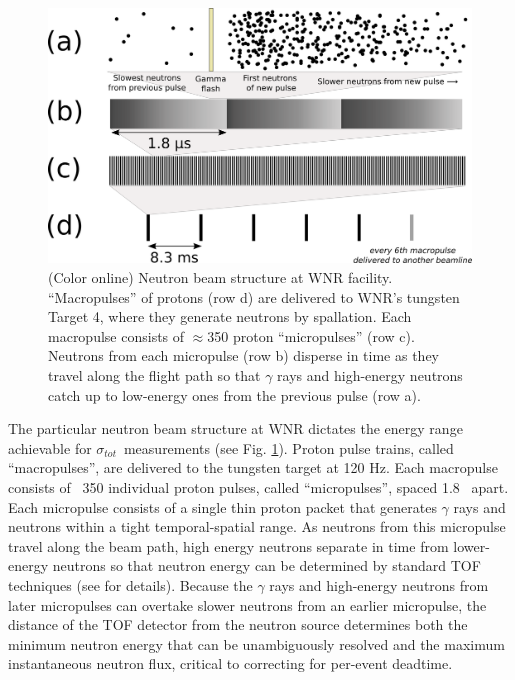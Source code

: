 \documentclass[twocolumn,secnumarabic,amssymb, nobibnotes, aps, prl,
superscriptaddress, nobalancelastpage]{revtex4}
\newcommand{\tot}{\ensuremath{\sigma_{tot}}}
\begin{document}
\begin{figure}
    \includegraphics[width=\linewidth]{figures/beamStructure.png}
    \caption{(Color online) Neutron beam structure at WNR facility.
        ``Macropulses'' of protons (row d) are delivered to
        WNR's tungsten Target 4, where they generate neutrons by spallation.
        Each macropulse consists of
        $\approx$350 proton ``micropulses'' (row c). Neutrons
        from each micropulse (row b) disperse in
        time as they travel along the flight path so that $\gamma$ rays and high-energy 
    neutrons catch up to low-energy ones from the previous pulse (row a).}
    \label{BeamStructure}
\end{figure}

The particular neutron beam structure at WNR dictates the energy range
achievable for \tot\ measurements (see Fig. \ref{BeamStructure}).
Proton pulse trains, called ``macropulses'', are delivered to the tungsten target at 120 Hz.
Each macropulse consists of ~350 individual proton pulses, called
``micropulses'', spaced 1.8 
\micro\second\ apart. Each micropulse consists of a single thin proton packet
that generates $\gamma$ rays and neutrons within a tight
temporal-spatial range. As neutrons from this micropulse travel along the beam path, 
high energy neutrons separate in time from lower-energy neutrons so that neutron
energy can be determined by standard TOF techniques (see \cite{Moore1980} for details).
Because the $\gamma$ rays and high-energy neutrons from later micropulses can
overtake slower neutrons from an earlier micropulse, the distance of the TOF
detector from the neutron source determines both the minimum neutron energy that can be 
unambiguously resolved and the maximum instantaneous neutron flux, critical to correcting
for per-event deadtime.
\end{document}
